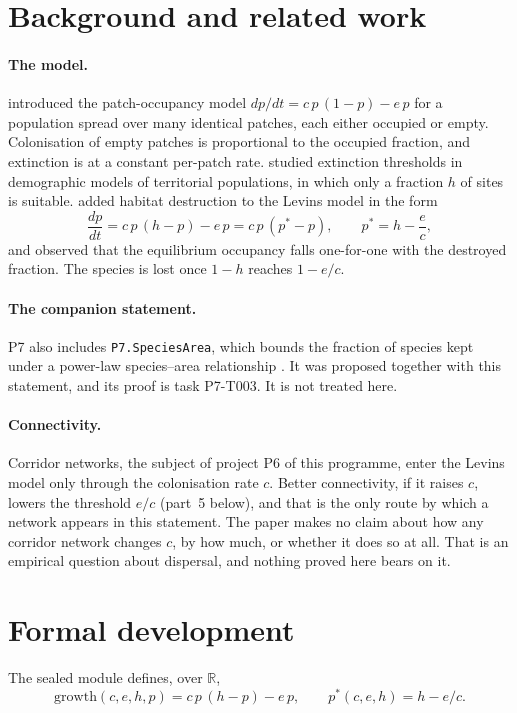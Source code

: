 \documentclass[11pt]{article}
\begin{document}
\section{Background and related work}
\paragraph{The model.} \citet{Levins1969} introduced the patch-occupancy model
$dp/dt=c\,p\,(1-p)-e\,p$ for a population spread over many identical patches, each either occupied
or empty. Colonisation of empty patches is proportional to the occupied fraction, and extinction
is at a constant per-patch rate. \citet{Lande1987} studied extinction thresholds in demographic
models of territorial populations, in which only a fraction $h$ of sites is suitable.
\citet{NeeMay1992} added habitat destruction to the Levins model in the form
\[ \frac{dp}{dt} = c\,p\,(h-p) - e\,p = c\,p\,(p^*-p),\qquad p^* = h - \frac{e}{c}, \]
and observed that the equilibrium occupancy falls one-for-one with the destroyed fraction. The
species is lost once $1-h$ reaches $1-e/c$.

\paragraph{The companion statement.} P7 also includes \texttt{P7.SpeciesArea}, which bounds the
fraction of species kept under a power-law species--area relationship \citep{Arrhenius1921}. It
was proposed together with this statement, and its proof is task P7-T003. It is not treated here.

\paragraph{Connectivity.} Corridor networks, the subject of project P6 of this programme, enter
the Levins model only through the colonisation rate $c$. Better connectivity, if it raises $c$,
lowers the threshold $e/c$ (part~5 below), and that is the only route by which a network appears
in this statement. The paper makes no claim about how any corridor network changes $c$, by how
much, or whether it does so at all. That is an empirical question about dispersal, and nothing
proved here bears on it.

\section{Formal development}
The sealed module defines, over $\mathbb{R}$,
\[ \mathrm{growth}(c,e,h,p)=c\,p\,(h-p)-e\,p,\qquad p^*(c,e,h)=h-e/c. \]
\end{document}
